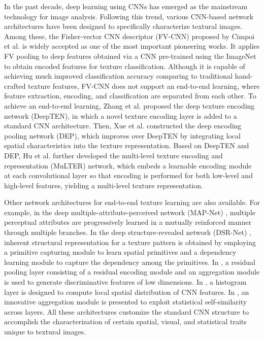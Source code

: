 \documentclass{aci}
\numberwithin{equation}{section}
\begin{document}
In the past decade, deep learning using CNNs has emerged as the mainstream
technology for image analysis. Following this trend, various CNN-based network
architectures have been designed to specifically characterize textural images.
Among these, the Fisher-vector CNN descriptor (FV-CNN) proposed by Cimpoi et
al. \cite{cimpoi_deep_2015} is widely accepted as one of the most important
pioneering works. It applies FV pooling to deep features obtained via a CNN
pre-trained using the ImageNet \cite{krizhevsky_imagenet_2017} to obtain encoded features
for texture classification. Although it is capable of achieving much improved
classification accuracy comparing to traditional hand-crafted texture features,
FV-CNN does not support an end-to-end learning, where feature extraction,
encoding, and classification are separated from each other. To achieve an
end-to-end learning, Zhang et al. \cite{zhang_deep_2017} proposed the deep texture
encoding network (DeepTEN), in which a novel texture encoding layer is added to
a standard CNN architecture. Then, Xue et al. \cite{xue_deep_2018} constructed the
deep encoding pooling network (DEP), which improves over DeepTEN by integrating
local spatial characteristics into the texture representation. Based on DeepTEN
and DEP, Hu et al. \cite{hu_multi_2019} further developed the multi-level texture
encoding and representation (MuLTER) network, which embeds a learnable encoding
module at each convolutional layer so that encoding is performed for both
low-level and high-level features, yielding a multi-level texture
representation.

Other network architectures for end-to-end texture learning are also available.
For example, in the deep multiple-attribute-perceived network (MAP-Net)
\cite{zhai_deep_2019}, multiple perceptual attributes are progressively learned
in a mutually reinforced manner through multiple branches. In the deep
structure-revealed network (DSR-Net) \cite{zhai_deep_2020}, inherent structural
representation for a texture pattern is obtained by employing a primitive
capturing module to learn spatial primitives and a dependency learning module to
capture the dependency among the primitives. In \cite{mao_deep_2021}, a residual
pooling layer consisting of a residual encoding module and an aggregation module
is used to generate discriminative features of low dimensions. In
\cite{peeples_histogram_2021}, a histogram layer is designed to compute local
spatial distribution of CNN features. In \cite{chen_deep_2021}, an innovative
aggregation module is presented to exploit statistical self-similarity across
layers. All these architectures customize the standard CNN structure to
accomplish the characterization of certain spatial, visual, and statistical
traits unique to textural images.
\end{document}
